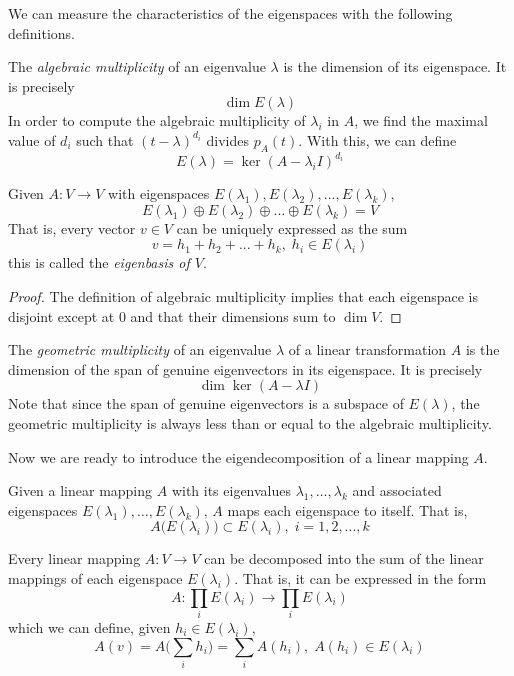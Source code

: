 \documentclass{article}
\begin{document}
    We can measure the characteristics of the eigenspaces with the following definitions. 

    \begin{definition}
    The \textit{algebraic multiplicity} of an eigenvalue $\lambda$ is the dimension of its eigenspace. It is precisely
    \[\dim{E(\lambda)}\]  
    In order to compute the algebraic multiplicity of $\lambda_i$ in $A$, we find the maximal value of $d_i$ such that $(t-\lambda)^{d_i}$ divides $p_A (t)$. With this, we can define 
    \[E(\lambda) = \ker{(A - \lambda_i I)^{d_i}}\]
    \end{definition} 

    \begin{theorem}
    Given $A: V \longrightarrow V$ with eigenspaces $E(\lambda_1), E(\lambda_2), ..., E(\lambda_k)$, 
    \[E(\lambda_1) \oplus E(\lambda_2) \oplus ... \oplus E(\lambda_k) = V\]
    That is, every vector $v \in V$ can be uniquely expressed as the sum 
    \[ v = h_1 + h_2 + ... + h_k, \; h_i \in E(\lambda_i)\]
    this is called the \textit{eigenbasis of $V$}. 
    \end{theorem}
    \begin{proof}
    The definition of algebraic multiplicity implies that each eigenspace is disjoint except at $0$ and that their dimensions sum to $\dim{V}$. 
    \end{proof}

    \begin{definition}
    The \textit{geometric multiplicity} of an eigenvalue $\lambda$ of a linear transformation $A$ is the dimension of the span of genuine eigenvectors in its eigenspace. It is precisely 
    \[\dim{\ker{(A - \lambda I)}}\]
    Note that since the span of genuine eigenvectors is a subspace of $E(\lambda)$, the geometric multiplicity is always less than or equal to the algebraic multiplicity. 
    \end{definition}

    Now we are ready to introduce the eigendecomposition of a linear mapping $A$.

    \begin{theorem}
    Given a linear mapping $A$ with its eigenvalues $\lambda_1, \ldots, \lambda_k$ and associated eigenspaces $E(\lambda_1), \ldots, E(\lambda_k)$, $A$ maps each eigenspace to itself. That is, 
    \[A\big( E(\lambda_i) \big) \subset E(\lambda_i), \; i = 1, 2, ..., k\]
    \end{theorem}

    \begin{corollary}
    Every linear mapping $A: V \longrightarrow V$ can be decomposed into the sum of the linear mappings of each eigenspace $E(\lambda_i)$. That is, it can be expressed in the form 
    \[A: \prod_i E(\lambda_i) \longrightarrow \prod_i E(\lambda_i)\]
    which we can define, given $h_i \in E(\lambda_i)$, 
    \[A(v) = A\bigg(\sum_i h_i \bigg) = \sum_i A(h_i), \; A(h_i) \in E(\lambda_i) \]
    \end{corollary}
\end{document}

